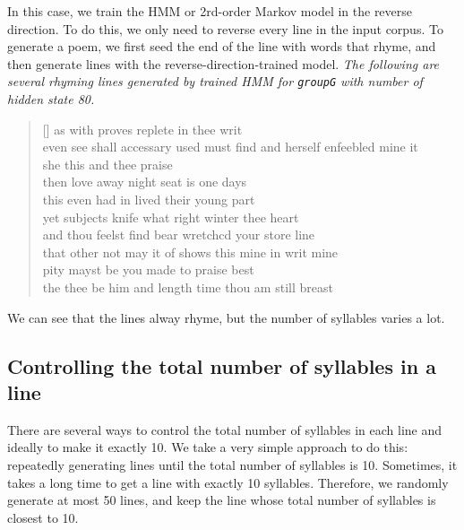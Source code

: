 In this case, we train the HMM or 2rd-order Markov model in the reverse direction. To do this, we only need to reverse every line in the input corpus. To generate a poem, we first seed the end of the line with words that rhyme, and then generate lines with the reverse-direction-trained model. \textit{The following are several rhyming lines generated by trained HMM for \texttt{groupG} with number of hidden state 80.}
\settowidth{\versewidth}{even  see  shall  accessary  used  must  find  and  herself  enfeebled  mine  it}
\begin{verse}[\versewidth]
 as  with  proves  replete  in  thee  writ \\
 even  see  shall  accessary  used  must  find  and  herself  enfeebled  mine  it  \\
 she  this  and  thee  praise  \\
 then  love  away  night  seat  is  one  days  \\
 this  even  had  in  lived  their  young  part  \\
 yet  subjects  knife  what  right  winter  thee  heart  \\
 and  thou  feelst  find  bear  wretchcd  your  store  line  \\
 that  other  not  may  it  of  shows  this  mine  in  writ  mine  \\
 pity  mayst  be  you  made  to  praise  best  \\
 the  thee  be  him  and  length  time  thou  am  still  breast  
\end{verse}
We can see that the lines alway rhyme, but the number of syllables varies a lot.

\subsection{Controlling the total number of syllables in a line}\label{sec:syllablecount}
There are several ways to control the total number of syllables in each line and ideally to make it exactly 10. We take a very simple approach to do this: repeatedly generating lines until the total number of syllables is 10. Sometimes, it takes a long time to get a line with exactly 10 syllables. Therefore, we randomly generate at most 50 lines, and keep the line whose total number of syllables is closest to 10.

